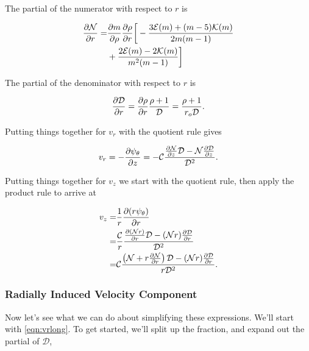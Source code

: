 \noindent The partial of the numerator with respect to \(r\) is

\begin{equation}
    \begin{split}
        \frac{\partial \mathcal{N}}{\partial r} =& \frac{\partial m}{\partial \rho}\frac{\partial \rho}{\partial r} \bigg[ -\frac{3\mathcal{E}(m) + (m-5)\mathcal{K}(m)}{2m(m-1)} \\
         &+ \frac{2\mathcal{E}(m) - 2\mathcal{K}(m)}{m^2(m-1)} \bigg]\\
    \end{split}
\end{equation}

\noindent The partial of the denominator with respect to \(r\) is

\begin{equation}
    \frac{\partial \mathcal{D}}{\partial r} = \frac{\partial \rho}{\partial r}\frac{\rho+1}{\mathcal{D}} = \frac{\rho+1}{r_o\mathcal{D}}.
\end{equation}

\noindent Putting things together for \(v_r\) with the quotient rule gives

\begin{equation}
    \label{eqn:vrlong}
        v_r = -\frac{\partial \psi_\theta}{\partial z} = -\mathcal{C}\frac{\frac{\partial \mathcal{N}}{\partial z}\mathcal{D} - \mathcal{N}\frac{\partial \mathcal{D}}{\partial z}}{\mathcal{D}^2}.
\end{equation}

\noindent Putting things together for \(v_z\) we start with the quotient rule, then apply the product rule to arrive at

\begin{equation}
    \label{eqn:vzlong}
    \begin{aligned}
        v_z =& \frac{1}{r}\frac{\partial (r\psi_\theta)}{\partial r} \\
        =& \frac{\mathcal{C}}{r}\frac{\frac{\partial (\mathcal{N}r)}{\partial r}\mathcal{D} - (\mathcal{N}r)\frac{\partial \mathcal{D}}{\partial r}}{\mathcal{D}^2} \\
        =& \mathcal{C}\frac{\left(\mathcal{N} + r\frac{\partial \mathcal{N}}{\partial r}\right)\mathcal{D} - (\mathcal{N}r)\frac{\partial \mathcal{D}}{\partial r}}{r\mathcal{D}^2}.
\end{aligned}
\end{equation}

\subsubsection{Radially Induced Velocity Component}

Now let's see what we can do about simplifying these expressions.
%
We'll start with \cref{eqn:vrlong}.
%
To get started, we'll split up the fraction, and expand out the partial of \(\mathcal{D}\),

